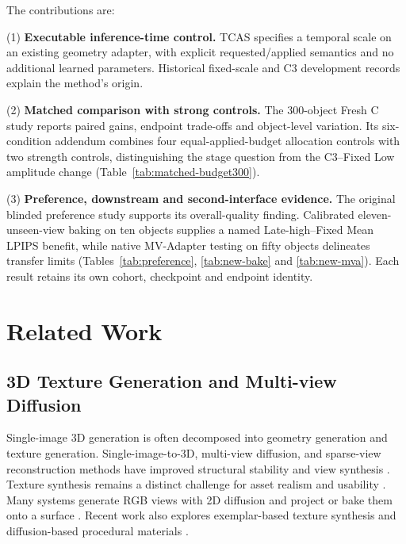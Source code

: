 \documentclass[times,twocolumn,final]{elsarticle}
\begin{document}
The contributions are:

(1) \textbf{Executable inference-time control.} TCAS specifies a temporal scale on an existing geometry adapter, with explicit requested/applied semantics and no additional learned parameters. Historical fixed-scale and C3 development records explain the method's origin.

(2) \textbf{Matched comparison with strong controls.} The 300-object Fresh C study reports paired gains, endpoint trade-offs and object-level variation. Its six-condition addendum combines four equal-applied-budget allocation controls with two strength controls, distinguishing the stage question from the C3--Fixed Low amplitude change (Table~\ref{tab:matched-budget300}).

(3) \textbf{Preference, downstream and second-interface evidence.} The original blinded preference study supports its overall-quality finding. Calibrated eleven-unseen-view baking on ten objects supplies a named Late-high--Fixed Mean LPIPS benefit, while native MV-Adapter testing on fifty objects delineates transfer limits (Tables~\ref{tab:preference}, \ref{tab:new-bake} and \ref{tab:new-mva}). Each result retains its own cohort, checkpoint and endpoint identity.

\section{Related Work}
\label{sec:related}

\subsection{3D Texture Generation and Multi-view Diffusion}
\label{subsec:3dtex}

Single-image 3D generation is often decomposed into geometry generation and texture generation. Single-image-to-3D, multi-view diffusion, and sparse-view reconstruction methods have improved structural stability and view synthesis \cite{liu2023zero1to3,shi2023zero123pp,liu2023syncdreamer,long2023wonder3d,shi2024mvdream,wang2023imagedream,xu2024instantmesh,ke2024era3d}. Texture synthesis remains a distinct challenge for asset realism and usability \cite{perla2026survey}. Many systems generate RGB views with 2D diffusion and project or bake them onto a surface \cite{chen2023text2tex,richardson2023texture,poole2023dreamfusion,chen2023fantasia3d}. Recent work also explores exemplar-based texture synthesis and diffusion-based procedural materials \cite{guzman2026adaptive,lv2025interpretable}.
\end{document}
